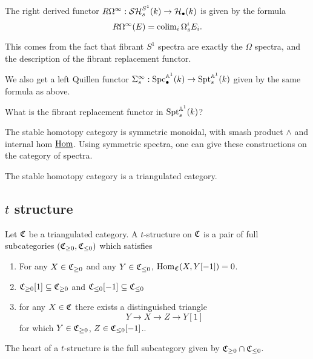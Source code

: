 \documentclass{amsart}%
\begin{document}
\begin{remark}
  The right derived functor
  $R\Omega^{\infty} : \mathcal{SH}^{S^1}_s(k) \to \mathcal{H}_{\bullet}(k)$ is given by
  the formula
  \begin{equation*}
    R\Omega^{\infty}(E) = \operatorname{colim}_i \Omega_s^{i}E_i.
  \end{equation*}

  This comes from the fact that fibrant $S^1$ spectra are exactly the
  $\Omega$ spectra, and the description of the fibrant replacement
  functor. 
\end{remark}

\begin{remark}
  We also get a left Quillen functor
  $ \Sigma^{\infty}_s : \mathrm{Spc}_{\bullet}^{\mathbb{A}^1}(k) \to
  \mathrm{Spt}_s^{\mathbb{A}^1}(k)$ given by the same formula as above.

  What is the fibrant replacement functor in $\mathrm{Spt}_s^{\mathbb{A}^1}(k)$?
\end{remark}

\begin{remark}
  The stable homotopy category is symmetric monoidal, with smash
  product $\wedge$ and internal hom $\underline{\operatorname{Hom}}$. Using
  symmetric spectra, one can give these constructions on the category
  of spectra.

  The stable homotopy category is a triangulated category.

  
\end{remark}

\subsection{$t$ structure}

\begin{definition}
  Let $\mathfrak{C}$ be a triangulated category. A $t$-structure on $\mathfrak{C}$
  is a pair of full subcategories $(\mathfrak{C}_{\geq 0}, \mathfrak{C}_{\leq 0})$
  which satisfies 
  \begin{enumerate}
      \item For any $X \in \mathfrak{C}_{\geq 0}$ and any
    $ Y \in \mathfrak{C}_{\leq 0}$, $\operatorname{Hom}_{\mathfrak{C}}(X, Y[-1])=0$.
      \item $\mathfrak{C}_{\geq 0}[1] \subseteq \mathfrak{C}_{\geq 0}$ and
    $\mathfrak{C}_{\leq 0}[-1] \subseteq \mathfrak{C}_{\leq 0}$

      \item for any $X \in \mathfrak{C}$ there exists a distinguished triangle 
    \begin{equation*}
      Y \to X \to Z \to Y[1]
    \end{equation*}
    for which $Y \in \mathfrak{C}_{\geq 0}$, $Z\in \mathfrak{C}_{\leq 0}[-1]$..
  \end{enumerate}

  The heart of a $t$-structure is the full subcategory given by
  $\mathfrak{C}_{\geq 0} \cap \mathfrak{C}_{\leq 0}$. 
\end{definition}
\end{document}
